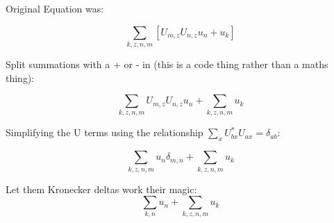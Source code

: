 \documentclass[12pt,a4paper]{article}
\begin{document}
Original Equation was:

\begin{dmath*}
\sum\limits_{k,z,n,m} \left[ U_{m,z} U_{n,z} u_{n}+ u_{k}\right]
\end{dmath*}

Split summations with a + or - in (this is a code thing rather than a maths thing):

\begin{dmath*}
\sum\limits_{k,z,n,m}  U_{m,z} U_{n,z} u_{n}+
\sum\limits_{k,z,n,m}   u_{k} 
\end{dmath*}

Simplifying the U terms using the relationship $\sum\limits_{x}U^{*}_{bx}U_{ax} = \delta_{ab}$:

\begin{dmath*}
\sum\limits_{k,z,n,m}   u_{n} \delta_{m,n}+
\sum\limits_{k,z,n,m}   u_{k} 
\end{dmath*}

Let them Kronecker deltas work their magic: \begin{dmath*}
\sum\limits_{k,n}   u_{n} +
\sum\limits_{k,z,n,m}   u_{k} 
\end{dmath*}
\end{document}
